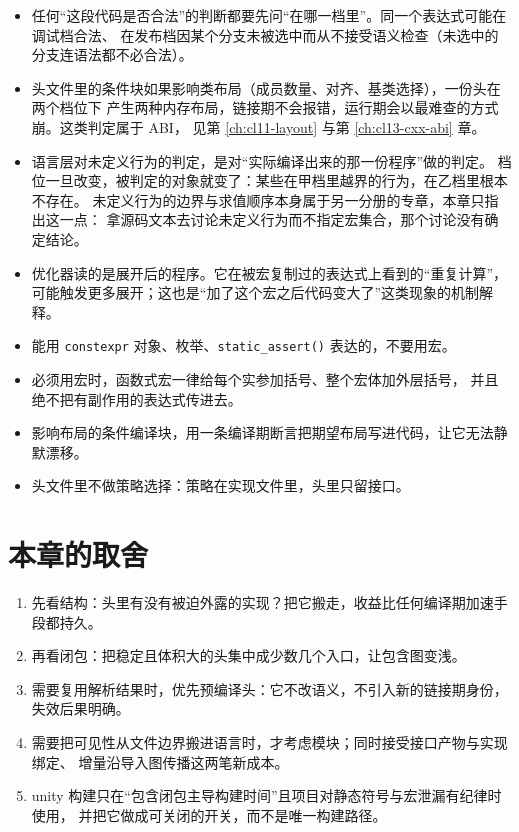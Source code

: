 \documentclass[12pt,a4paper,fontset=fandol]{ctexbook}
\newcommand{\Fn}[1]{\texttt{#1()}}
\newcommand{\Tp}[1]{\texttt{#1}}
\begin{document}
\begin{itemize}
  \item 任何“这段代码是否合法”的判断都要先问“在哪一档里”。同一个表达式可能在调试档合法、
    在发布档因某个分支未被选中而从不接受语义检查（未选中的分支连语法都不必合法）。
  \item 头文件里的条件块如果影响类布局（成员数量、对齐、基类选择），一份头在两个档位下
    产生两种内存布局，链接期不会报错，运行期会以最难查的方式崩。这类判定属于 ABI，
    见第 \ref{ch:cl11-layout} 与第 \ref{ch:cl13-cxx-abi} 章。
  \item 语言层对未定义行为的判定，是对“实际编译出来的那一份程序”做的判定。
    档位一旦改变，被判定的对象就变了：某些在甲档里越界的行为，在乙档里根本不存在。
    未定义行为的边界与求值顺序本身属于另一分册的专章，本章只指出这一点：
    拿源码文本去讨论未定义行为而不指定宏集合，那个讨论没有确定结论。
  \item 优化器读的是展开后的程序。它在被宏复制过的表达式上看到的“重复计算”，
    可能触发更多展开；这也是“加了这个宏之后代码变大了”这类现象的机制解释。
\end{itemize}

\begin{guideline}[title={把预处理从接口里赶出去}]
\begin{itemize}
  \item 能用 \Tp{constexpr} 对象、枚举、\Fn{static\_assert} 表达的，不要用宏。
  \item 必须用宏时，函数式宏一律给每个实参加括号、整个宏体加外层括号，
    并且绝不把有副作用的表达式传进去。
  \item 影响布局的条件编译块，用一条编译期断言把期望布局写进代码，让它无法静默漂移。
  \item 头文件里不做策略选择：策略在实现文件里，头里只留接口。
\end{itemize}
\end{guideline}

\section{本章的取舍}\label{sec:cl02-wrap}

\begin{bestpractice}[title={包含、复用与模块的决策顺序}]
\begin{enumerate}
  \item 先看结构：头里有没有被迫外露的实现？把它搬走，收益比任何编译期加速手段都持久。
  \item 再看闭包：把稳定且体积大的头集中成少数几个入口，让包含图变浅。
  \item 需要复用解析结果时，优先预编译头：它不改语义，不引入新的链接期身份，失效后果明确。
  \item 需要把可见性从文件边界搬进语言时，才考虑模块；同时接受接口产物与实现绑定、
    增量沿导入图传播这两笔新成本。
  \item unity 构建只在“包含闭包主导构建时间”且项目对静态符号与宏泄漏有纪律时使用，
    并把它做成可关闭的开关，而不是唯一构建路径。
\end{enumerate}
\end{bestpractice}
\end{document}
